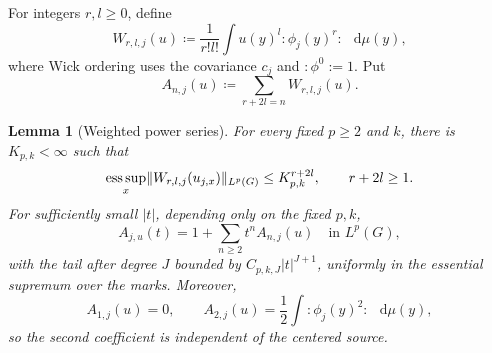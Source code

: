 \documentclass[11pt,reqno]{amsart}
\numberwithin{equation}{section}
\theoremstyle{plain}
\newtheorem{lemma}[lemma]{Lemma}
\theoremstyle{definition}
\DeclarePairedDelimiter{\norm}{\lVert}{\rVert}
\newcommand{\dd}{\mathop{}\!\mathrm d}
\begin{document}
For integers $r,l\geq0$, define
\begin{equation}
 W_{r,l,j}(u)
 \coloneqq\frac1{r!l!}\int u(y)^l:\!\phi_j(y)^r\!:\,\dd\mu(y),
 \label{eq:prescribed-weighted-Wick}
\end{equation}
where Wick ordering uses the covariance $c_j$ and $:\!\phi^0\!:=1$.  Put
\begin{equation}
 A_{n,j}(u)\coloneqq\sum_{r+2l=n}W_{r,l,j}(u).
 \label{eq:prescribed-A-coefficients}
\end{equation}

\begin{lemma}[Weighted power series]
\label{lem:prescribed-weighted-Wick}
For every fixed $p\geq2$ and $k$, there is $K_{p,k}<\infty$ such that
\begin{equation}
 \mathop{\rm ess\,sup}_{x}
 \norm{W_{r,l,j}(u_{j,x})}_{L^p(G)}
 \leq K_{p,k}^{r+2l},
 \qquad r+2l\geq1.
 \label{eq:prescribed-weighted-Wick-bound}
\end{equation}
For sufficiently small $|t|$, depending only on the fixed $p,k$,
\begin{equation}
 A_{j,u}(t)=1+\sum_{n\geq2}t^nA_{n,j}(u)
 \quad\text{in }L^p(G),
 \label{eq:prescribed-A-series}
\end{equation}
with the tail after degree $J$ bounded by $C_{p,k,J}|t|^{J+1}$, uniformly in the essential supremum over the marks.  Moreover,
\begin{equation}
 A_{1,j}(u)=0,
 \qquad
 A_{2,j}(u)=\frac12\int:\!\phi_j(y)^2\!:\,\dd\mu(y),
 \label{eq:prescribed-first-Wick-coefficients}
\end{equation}
so the second coefficient is independent of the centered source.
\end{lemma}
\end{document}
